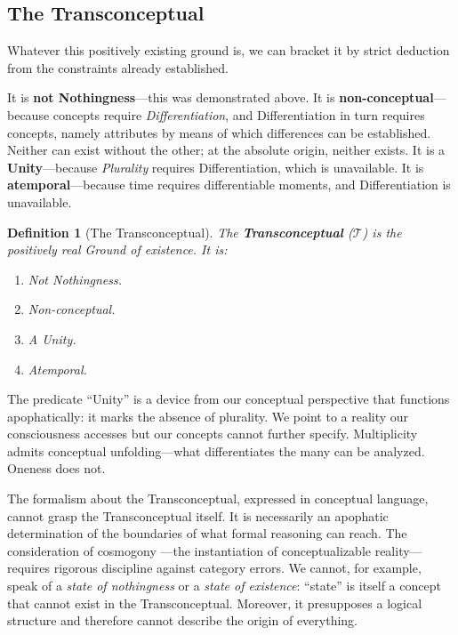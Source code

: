 \documentclass[11pt, a4paper]{article}
\theoremstyle{formalism}
\newtheorem{formalism}{Definition}
\begin{document}
\subsection{The Transconceptual}

Whatever this positively existing ground is, we can bracket it by strict
deduction from the constraints already established.

It is \textbf{not Nothingness}---this was demonstrated above. It is
\textbf{non-conceptual}---because concepts require \textit{Differentiation},
and Differentiation in turn requires concepts, namely attributes by means of
which differences can be established. Neither can exist without the other; at
the absolute origin, neither exists. It is a \textbf{Unity}---because
\textit{Plurality} requires Differentiation, which is unavailable. It is
\textbf{atemporal}---because time requires differentiable moments, and
Differentiation is unavailable.

\begin{formalism}[The Transconceptual]
    The \textbf{Transconceptual} ($\mathcal{T}$) is the positively real Ground
    of existence. It is:
    \begin{enumerate}[label= (\roman*)]
        \item Not Nothingness.
        \item Non-conceptual.
        \item A Unity.
        \item Atemporal.
    \end{enumerate}
\end{formalism}

The predicate ``Unity'' is a device from our conceptual perspective that
functions apophatically: it marks the absence of plurality. We point to a
reality our consciousness accesses but our concepts cannot further specify.
Multiplicity admits conceptual unfolding---what differentiates the many can
be analyzed. Oneness does not.

The formalism about the Transconceptual, expressed in conceptual language,
cannot grasp the Transconceptual itself. It is necessarily an apophatic
determination of the boundaries of what formal reasoning can reach. The
consideration of cosmogony ---the instantiation of conceptualizable
reality---requires rigorous discipline against category errors. We cannot, for
example, speak of a \textit{state of nothingness} or a \textit{state of
existence}: ``state'' is itself a concept that cannot exist in the
Transconceptual. Moreover, it presupposes a logical structure and therefore
cannot describe the origin of everything. 
\end{document}
